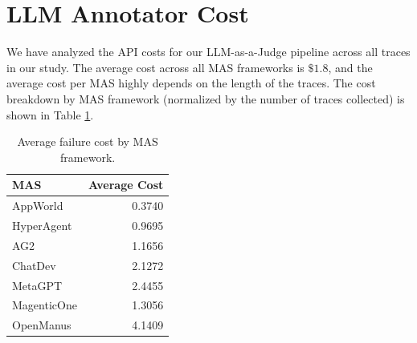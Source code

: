 \section{LLM Annotator Cost}
\label{sec:llm_judge_cost}

We have analyzed the API costs for our LLM-as-a-Judge pipeline across all traces in our study. The average cost across all MAS frameworks is $\$1.8$, and the average cost per MAS highly depends on the length of the traces. The cost breakdown by MAS framework (normalized by the number of traces collected) is shown in Table \ref{tab:llm_judge_cost_breakdown}.

\begin{table}[ht!]
    \small
    \renewcommand{\arraystretch}{1.25}
    \setlength{\tabcolsep}{6pt}
    \centering
    \caption{Average failure cost by MAS framework.}
    \label{tab:avg-cost-by-mas}
    \begin{tabular}{p{3.0cm} r}
        \toprule
        \textbf{MAS} & \textbf{Average Cost} \\
        \midrule
        AppWorld    & 0.3740 \\
        HyperAgent  & 0.9695 \\
        AG2         & 1.1656 \\
        ChatDev     & 2.1272 \\
        MetaGPT     & 2.4455 \\
        MagenticOne & 1.3056 \\
        OpenManus   & 4.1409 \\
        \bottomrule
    \end{tabular}
    \label{tab:llm_judge_cost_breakdown}
\end{table}


